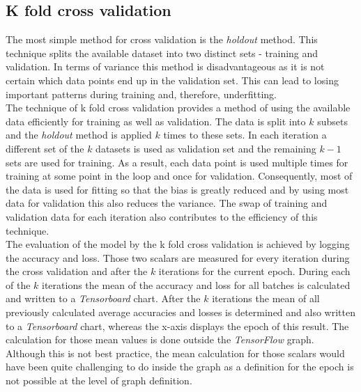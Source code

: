 \subsection{K fold cross validation}
\label{subsec:kfoldxvalidation}
The most simple method for cross validation is the \textit{holdout} method. This technique splits the available dataset into two distinct sets - training and validation. In terms of variance this method is disadvantageous as it is not certain which data points end up in the validation set. This can lead to losing important patterns during training and, therefore, underfitting. 
\\
The technique of k fold cross validation provides a method of using the available data efficiently for training as well as validation. The data is split into $k$ subsets and the \textit{holdout} method is applied $k$ times to these sets. In each iteration a different set of the $k$ datasets is used as validation set and the remaining $k-1$ sets are used for training. As a result, each data point is used multiple times for training at some point in the loop and once for validation. Consequently, most of the data is used for fitting so that the bias is greatly reduced and by using most data for validation this also reduces the variance. The swap of training and validation data for each iteration also contributes to the efficiency of this technique. 
\\
The evaluation of the model by the k fold cross validation is achieved by logging the accuracy and loss. Those two scalars are measured for every iteration during the cross validation and after the $k$ iterations for the current epoch. During each of the $k$ iterations the mean of the accuracy and loss for all batches is calculated and written to a \textit{Tensorboard} chart. After the $k$ iterations the mean of all previously calculated average accuracies and losses is determined and also written to a \textit{Tensorboard} chart, whereas the x-axis displays the epoch of this result. The calculation for those mean values is done outside the \textit{TensorFlow} graph. Although this is not best practice, the mean calculation for those scalars would have been quite challenging to do inside the graph as a definition for the epoch is not possible at the level of graph definition. 


